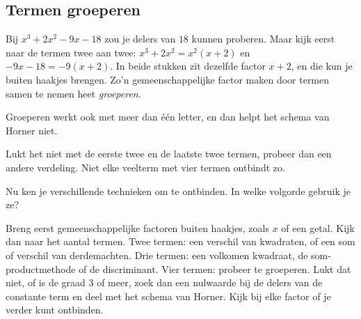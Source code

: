 \subsection{Termen groeperen}

Bij $x^3 + 2x^2 - 9x - 18$ zou je delers van $18$ kunnen proberen. Maar kijk eerst naar de termen twee aan twee: $x^3 + 2x^2 = x^2(x + 2)$ en $-9x - 18 = -9(x + 2)$. In beide stukken zit dezelfde factor $x + 2$, en die kun je buiten haakjes brengen. Zo'n gemeenschappelijke factor maken door termen samen te nemen heet \textit{groeperen}.


Groeperen werkt ook met meer dan één letter, en dan helpt het schema van Horner niet.


Lukt het niet met de eerste twee en de laatste twee termen, probeer dan een andere verdeling. Niet elke veelterm met vier termen ontbindt zo.

Nu ken je verschillende technieken om te ontbinden. In welke volgorde gebruik je ze?

\begin{werkwijze}
Breng eerst gemeenschappelijke factoren buiten haakjes, zoals $x$ of een getal. Kijk dan naar het aantal termen. Twee termen: een verschil van kwadraten, of een som of verschil van derdemachten. Drie termen: een volkomen kwadraat, de som-productmethode of de discriminant. Vier termen: probeer te groeperen. Lukt dat niet, of is de graad $3$ of meer, zoek dan een nulwaarde bij de delers van de constante term en deel met het schema van Horner. Kijk bij elke factor of je verder kunt ontbinden.
\end{werkwijze}


